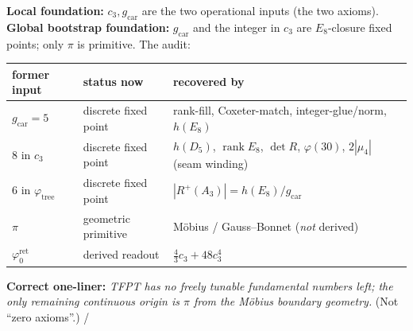 \documentclass[11pt,a4paper]{article}
\newcommand{\gcar}{g_{\mathrm{car}}}
\newcommand{\cthree}{c_3}
\newcommand{\phiz}{\varphi_0^{\mathrm{ret}}}
\theoremstyle{definition}
\renewcommand{\arraystretch}{1.15}
\begin{document}
\begin{keybox}
\textbf{Local foundation:} $\cthree,\gcar$ are the two operational inputs (the two axioms).
\textbf{Global bootstrap foundation:} $\gcar$ and the integer in $\cthree$ are $E_8$-closure fixed
points; only $\pi$ is primitive. The audit:
\begin{center}\small\renewcommand{\arraystretch}{1.2}
\begin{tabularx}{\linewidth}{@{}p{2.3cm}p{4.1cm}Y@{}}
\toprule
\textbf{former input} & \textbf{status now} & \textbf{recovered by} \\
\midrule
$\gcar=5$ & discrete fixed point & rank-fill, Coxeter-match, integer-glue/norm, $h(E_8)$ \\
$8$ in $\cthree$ & discrete fixed point & $h(D_5)$, $\operatorname{rank}E_8$, $\det R$, $\varphi(30)$, $2|\mu_4|$ (seam winding) \\
$6$ in $\varphi_{\mathrm{tree}}$ & discrete fixed point & $|R^+(A_3)|=h(E_8)/\gcar$ \\
$\pi$ & geometric primitive & Möbius / Gauss--Bonnet (\emph{not} derived) \\
$\phiz$ & derived readout & $\tfrac43\cthree+48\cthree^4$ \\
\bottomrule
\end{tabularx}
\end{center}
\textbf{Correct one-liner:} \emph{TFPT has no freely tunable fundamental numbers left; the only remaining
continuous origin is $\pi$ from the Möbius boundary geometry.} (Not ``zero axioms''.) \mE/\mO
\end{keybox}

\end{document}
